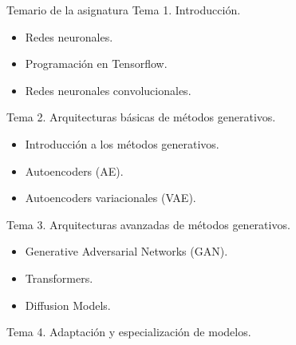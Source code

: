 \begin{frame}[allowframebreaks]{Temario de la asignatura}
\alert{\Large Tema 1. Introducción.}
\begin{itemize}
\item Redes neuronales.
\item Programación en Tensorflow.
\item Redes neuronales convolucionales.
\end{itemize}

\alert{\Large Tema 2. Arquitecturas básicas de métodos generativos.}
\begin{itemize}
\item Introducción a los métodos generativos.
\item Autoencoders (AE).
\item Autoencoders variacionales (VAE).
\end{itemize}

\framebreak

\alert{\Large Tema 3. Arquitecturas avanzadas de métodos generativos.}
\begin{itemize}
\item Generative Adversarial Networks (GAN).
\item Transformers.
\item Diffusion Models.
\end{itemize}

\alert{\Large Tema 4. Adaptación y especialización de modelos.}
\end{frame}

